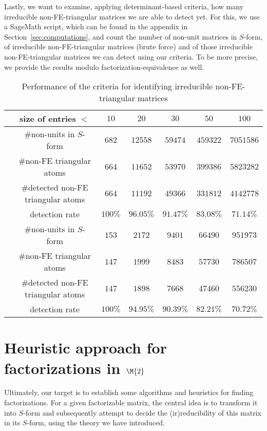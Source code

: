 Lastly, we want to examine, applying determinant-based criteria, how many irreducible non-FE-triangular matrices we are able to detect yet. For this, we use a SageMath script, which can be found in the appendix in Section~\ref{sec:computations}, and count the number of non-unit matrices in $S$-form, of irreducible non-FE-triangular matrices (brute force) and of those irreducible non-FE-triangular matrices we can detect using our criteria. To be more precise, we provide the results modulo factorization-equivalence as well.

\begin{table}[htbp]
\begin{center}
\begin{tabular}{c c|c c c c c } 
& size of entries $<$ & $10$ & $20$ & $30$ & $50$ & $100$ \\ \hline 
{} & $\#$non-units in $S$-form & $682$ & $12558$ & $59474$ & $459322$ & $7051586$ \\
& $\#$non-FE triangular atoms & $664$ & $11652$ & $53970$ & $399386$ & $5823282$ \\
& $\#$detected non-FE triangular atoms & $664$ & $11192$ & $49366$ & $331812$ & $4142778$ \\
& detection rate & $100 \%$ & $96.05 \%$ & $91.47 \%$ & $83.08 \%$  & $71.14 \%$\\ \hline \hline
{} & $\#$non-units in $S$-form & $153$ & $2172$ & $9401$ & $66490$ & $951973$ \\
& $\#$non-FE triangular atoms & $147$ & $1999$ & $8483$  & $57730$ & $786507$ \\
& $\#$detected non-FE triangular atoms & $147$ & $1898$ & $7668$ & $47460$ & $556230$ \\
& detection rate & $100 \%$ & $94.95 \%$ & $90.39 \%$ & $82.21 \%$ & $70.72 \%$ \\ 
\end{tabular} \caption{Performance of the criteria for identifying irreducible non-FE-triangular matrices}\label{table:performance-criteria}
\end{center}
\end{table}


\section{Heuristic approach for factorizations in $\M{2}$}\label{sec:heuristic}
Ultimately, our target is to establish some algorithms and heuristics for finding factorizations. For a given factorizable matrix, the central idea is to transform it into $S$-form and subsequently attempt to decide the (ir)reducibility of this matrix in its $S$-form, using the theory we have introduced.

